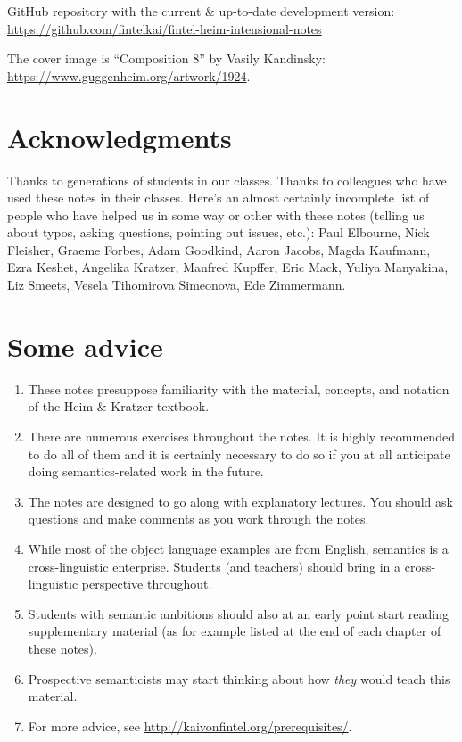 \medskip

\noindent GitHub repository with the current \& up-to-date development version:\\
\url{https://github.com/fintelkai/fintel-heim-intensional-notes}

\medskip

\noindent The cover image is ``Composition 8'' by Vasily Kandinsky:\\
\url{https://www.guggenheim.org/artwork/1924}.

\clearpage

\vspace*{\fill}

\section*{Acknowledgments}

Thanks to generations of students in our classes. Thanks to colleagues who have
used these notes in their classes. Here's an almost certainly incomplete list of
people who have helped us in some way or other with these notes (telling us
about typos, asking questions, pointing out issues, etc.): Paul Elbourne, Nick
Fleisher, Graeme Forbes, Adam Goodkind, Aaron Jacobs, Magda Kaufmann, Ezra
Keshet, Angelika Kratzer, Manfred Kupffer, Eric Mack, Yuliya Manyakina, Liz
Smeets, Vesela Tihomirova Simeonova, Ede Zimmermann.

\section*{Some advice}
\begin{enumerate}
\item These notes presuppose familiarity with the material, concepts, and
  notation of the Heim \& Kratzer textbook.
\item There are numerous exercises throughout the notes. It is highly
  recommended to do all of them and it is certainly necessary to do so if you at
  all anticipate doing semantics-related work in the future.
\item The notes are designed to go along with explanatory lectures. You should
  ask questions and make comments as you work through the notes.
\item While most of the object language examples are from English, semantics is
  a cross-linguistic enterprise. Students (and teachers) should bring in a
  cross-linguistic perspective throughout.
\item Students with semantic ambitions should also at an early point start
  reading supplementary material (as for example listed at the end of each
  chapter of these notes).
\item Prospective semanticists may start thinking about how \emph{they} would
  teach this material.
\item For more advice, see \url{http://kaivonfintel.org/prerequisites/}.
\end{enumerate}

